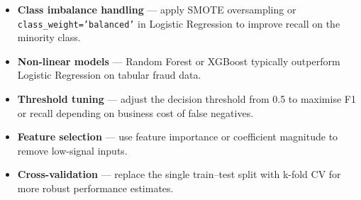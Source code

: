 \documentclass[12pt, a4paper]{article}
\begin{document}
\begin{itemize}
    \item \textbf{Class imbalance handling} — apply SMOTE oversampling or \texttt{class\_weight='balanced'} in Logistic Regression to improve recall on the minority class.
    \item \textbf{Non-linear models} — Random Forest or XGBoost typically outperform Logistic Regression on tabular fraud data.
    \item \textbf{Threshold tuning} — adjust the decision threshold from 0.5 to maximise F1 or recall depending on business cost of false negatives.
    \item \textbf{Feature selection} — use feature importance or coefficient magnitude to remove low-signal inputs.
    \item \textbf{Cross-validation} — replace the single train--test split with k-fold CV for more robust performance estimates.
\end{itemize}
\end{document}
